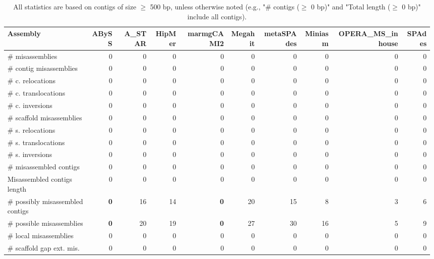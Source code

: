 \documentclass[12pt,a4paper]{article}
\begin{document}
\begin{table}[ht]
\begin{center}
\caption{All statistics are based on contigs of size $\geq$ 500 bp, unless otherwise noted (e.g., "\# contigs ($\geq$ 0 bp)" and "Total length ($\geq$ 0 bp)" include all contigs).}
\begin{tabular}{|l*{9}{|r}|}
\hline
Assembly & ABySS & A\_STAR & HipMer & marmgCAMI2 & Megahit & metaSPAdes & Miniasm & OPERA\_MS\_inhouse & SPAdes \\ \hline
\# misassemblies & 0 & 0 & 0 & 0 & 0 & 0 & 0 & 0 & 0 \\ \hline
\hspace{2mm}\# contig misassemblies & 0 & 0 & 0 & 0 & 0 & 0 & 0 & 0 & 0 \\ \hline
\hspace{5mm}\# c. relocations & 0 & 0 & 0 & 0 & 0 & 0 & 0 & 0 & 0 \\ \hline
\hspace{5mm}\# c. translocations & 0 & 0 & 0 & 0 & 0 & 0 & 0 & 0 & 0 \\ \hline
\hspace{5mm}\# c. inversions & 0 & 0 & 0 & 0 & 0 & 0 & 0 & 0 & 0 \\ \hline
\hspace{2mm}\# scaffold misassemblies & 0 & 0 & 0 & 0 & 0 & 0 & 0 & 0 & 0 \\ \hline
\hspace{5mm}\# s. relocations & 0 & 0 & 0 & 0 & 0 & 0 & 0 & 0 & 0 \\ \hline
\hspace{5mm}\# s. translocations & 0 & 0 & 0 & 0 & 0 & 0 & 0 & 0 & 0 \\ \hline
\hspace{5mm}\# s. inversions & 0 & 0 & 0 & 0 & 0 & 0 & 0 & 0 & 0 \\ \hline
\# misassembled contigs & 0 & 0 & 0 & 0 & 0 & 0 & 0 & 0 & 0 \\ \hline
Misassembled contigs length & 0 & 0 & 0 & 0 & 0 & 0 & 0 & 0 & 0 \\ \hline
\# possibly misassembled contigs & {\bf 0} & 16 & 14 & {\bf 0} & 20 & 15 & 8 & 3 & 6 \\ \hline
\hspace{5mm}\# possible misassemblies & {\bf 0} & 20 & 19 & {\bf 0} & 27 & 30 & 16 & 5 & 9 \\ \hline
\# local misassemblies & 0 & 0 & 0 & 0 & 0 & 0 & 0 & 0 & 0 \\ \hline
\# scaffold gap ext. mis. & 0 & 0 & 0 & 0 & 0 & 0 & 0 & 0 & 0 \\ \hline

\end{tabular}
\end{center}
\end{table}
\end{document}
